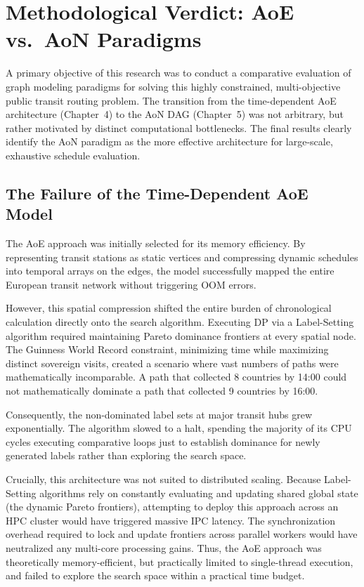 \section{Methodological Verdict: AoE vs.\ AoN Paradigms}
\label{sec:methodological_verdict_aoe_aon}

A primary objective of this research was to conduct a comparative evaluation of graph modeling paradigms for solving this highly constrained, multi-objective public transit routing problem. The transition from the time-dependent AoE architecture (Chapter~4) to the AoN DAG (Chapter~5) was not arbitrary, but rather motivated by distinct computational bottlenecks. The final results clearly identify the AoN paradigm as the more effective architecture for large-scale, exhaustive schedule evaluation.

\subsection{The Failure of the Time-Dependent AoE Model}
\label{subsec:failure_time_dependent_aoe}

The AoE approach was initially selected for its memory efficiency. By representing transit stations as static vertices and compressing dynamic schedules into temporal arrays on the edges, the model successfully mapped the entire European transit network without triggering OOM errors.

\medskip

However, this spatial compression shifted the entire burden of chronological calculation directly onto the search algorithm. Executing DP via a Label-Setting algorithm required maintaining Pareto dominance frontiers at every spatial node. The Guinness World Record constraint, minimizing time while maximizing distinct sovereign visits, created a scenario where vast numbers of paths were mathematically incomparable. A path that collected 8 countries by 14:00 could not mathematically dominate a path that collected 9 countries by 16:00.

\medskip

Consequently, the non-dominated label sets at major transit hubs grew exponentially. The algorithm slowed to a halt, spending the majority of its CPU cycles executing comparative loops just to establish dominance for newly generated labels rather than exploring the search space.

\medskip

Crucially, this architecture was not suited to distributed scaling. Because Label-Setting algorithms rely on constantly evaluating and updating shared global state (the dynamic Pareto frontiers), attempting to deploy this approach across an HPC cluster would have triggered massive IPC latency. The synchronization overhead required to lock and update frontiers across parallel workers would have neutralized any multi-core processing gains. Thus, the AoE approach was theoretically memory-efficient, but practically limited to single-thread execution, and failed to explore the search space within a practical time budget.

